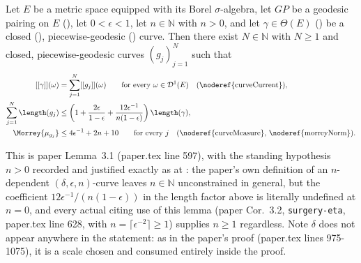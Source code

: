 \begin{lemma}[Surgery]
  \label{surgery-lem}
  Let $E$ be a metric space equipped with its Borel $\sigma$-algebra, let $GP$ be a geodesic
  pairing on $E$ (), let $0 < \epsilon < 1$, let $n \in \mathbb{N}$ with
  $n > 0$, and let $\gamma \in \Theta(E)$ () be a closed
  (), piecewise-geodesic () curve. Then there
  exist $N \in \mathbb{N}$ with $N \ge 1$ and closed, piecewise-geodesic curves $(g_j)_{j=1}^N$
  such that
  \begin{align}
    \label{eq:SurgeryLemCurrent}
    [[\gamma]](\omega) &= \sum_{j=1}^N [[g_j]](\omega) \qquad \text{for every } \omega \in
    \mathcal{D}^1(E) \quad \text{(\noderef{curveCurrent})}, \\
    \label{eq:SurgeryLemLength}
    \sum_{j=1}^N \length(g_j) &\le \left(1 + \frac{2\epsilon}{1-\epsilon} +
    \frac{12\epsilon^{-1}}{n(1-\epsilon)}\right) \length(\gamma), \\
    \label{eq:SurgeryLemMorrey}
    \Morrey{\mu_{g_j}} &\le 4\epsilon^{-1}+2n+10 \qquad \text{for every } j
    \quad \text{(\noderef{curveMeasure}, \noderef{morreyNorm})}.
  \end{align}

  This is paper Lemma~3.1 (paper.tex line 597), with the standing hypothesis $n>0$ recorded and
  justified exactly as at : the paper's own definition of an
  $n$-dependent $(\delta,\epsilon,n)$-curve leaves $n\in\mathbb{N}$ unconstrained in general, but
  the coefficient $12\epsilon^{-1}/(n(1-\epsilon))$ in the length factor above is literally
  undefined at $n=0$, and every actual citing use of this lemma (paper Cor.~3.2, \texttt{surgery-eta},
  paper.tex line 628, with $n=\lceil\epsilon^{-2}\rceil\ge1$) supplies $n\ge1$ regardless. Note
  $\delta$ does not appear anywhere in the statement: as in the paper's proof (paper.tex lines
  975-1075), it is a scale chosen and consumed entirely inside the proof.
\end{lemma}
